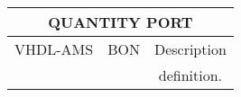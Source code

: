 \begin{center}
\begin{tabular}{ c  c  c }
\multicolumn{3}{c}{\textbf{QUANTITY PORT}}\\ 
\hline \hline
VHDL-AMS & BON & Description \\ 
\hline \hline

\begin{minipage}[c]{2.4cm} 
\centering
\smallskip \smallskip 

\smallskip \smallskip
\end{minipage}  
&
\begin{minipage}[c]{4.6cm}
\centering 
\smallskip \smallskip

\smallskip \smallskip
\end{minipage}  
& 
\begin{minipage}[c]{6cm}  
\smallskip \smallskip
definition.
\smallskip \smallskip
\end{minipage}\\ 
\end{tabular}
\end{center}
